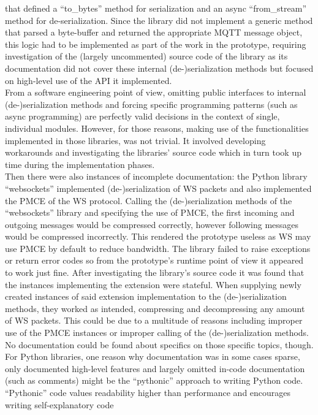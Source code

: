 that defined a \enquote{to\_bytes} method for serialization and an async \enquote{from\_stream} method for de-serialization. Since the library did not implement a generic method that parsed a byte-buffer and returned the appropriate \ac{MQTT} message object, this logic had to be implemented as part of the work in the prototype, requiring investigation of the (largely uncommented) source code of the library as its documentation did not cover these internal (de-)serialization methods but focused on high-level use of the API it implemented.\\
From a software engineering point of view, omitting public interfaces to internal (de-)serialization methods and forcing specific programming patterns (such as async programming) are perfectly valid decisions in the context of single, individual modules. However, for those reasons, making use of the functionalities implemented in those libraries, was not trivial. It involved developing workarounds and investigating the libraries' source code which in turn took up time during the implementation phases.\\
Then there were also instances of incomplete documentation: the Python library \enquote{websockets} implemented (de-)serialization of \ac{WS} packets and also implemented the \ac{PMCE}%
of the \ac{WS} protocol. Calling the (de-)serialization methods of the \enquote{websockets} library and specifying the use of \ac{PMCE}, the first incoming and outgoing messages would be compressed correctly, however following messages would be compressed incorrectly. This rendered the prototype useless as \ac{WS} may use \ac{PMCE} by default to reduce bandwidth. The library failed to raise exceptions or return error codes so from the prototype's runtime point of view it appeared to work just fine. After investigating the library's source code it was found that the instances implementing the extension were stateful. When supplying newly created instances of said extension implementation to the (de-)serialization methods, they worked as intended, compressing and decompressing any amount of \ac{WS} packets. This could be due to a multitude of reasons including improper use of the \ac{PMCE} instances or improper calling of the (de-)serialization methods. No documentation could be found about specifics on those specific topics, though.\\
For Python libraries, one reason why documentation was in some cases sparse, only documented high-level features and largely omitted in-code documentation (such as comments) might be the \enquote{pythonic} approach to writing Python code. \enquote{Pythonic} code values readability higher than performance and encourages writing self-explanatory code%
